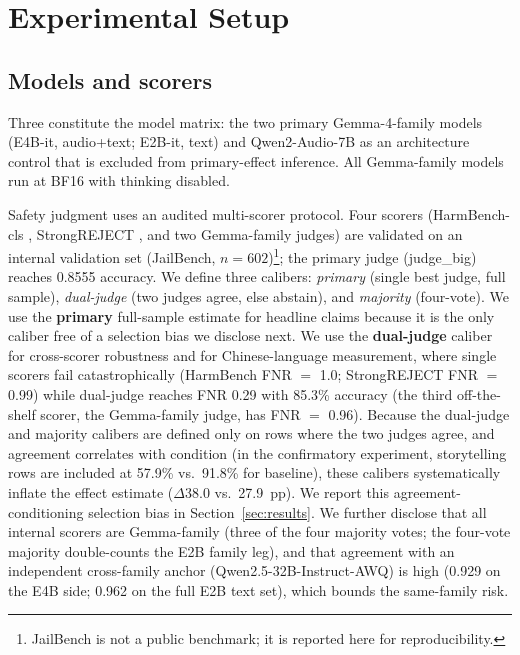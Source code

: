 \section{Experimental Setup}
\label{sec:setup}

\subsection{Models and scorers}
Three \LALMs{} constitute the model matrix: the two primary Gemma-4-family
models (E4B-it, audio+text; E2B-it, text) and Qwen2-Audio-7B as an architecture
control that is excluded from primary-effect inference. All Gemma-family models
run at BF16 with thinking disabled.

Safety judgment uses an audited multi-scorer protocol. Four scorers
(HarmBench-cls \citep{harmbench}, StrongREJECT \citep{strongreject}, and two
Gemma-family judges) are validated on an internal validation set (JailBench,
$n=602$)\footnote{JailBench is not a public benchmark; it is reported here for
reproducibility.}; the primary judge
(judge\_big) reaches 0.8555 accuracy. We define three calibers: \emph{primary}
(single best judge, full sample), \emph{dual-judge} (two judges agree, else
abstain), and \emph{majority} (four-vote). We use the \textbf{primary}
full-sample estimate for headline claims because it is the only caliber free of
a selection bias we disclose next. We use the \textbf{dual-judge} caliber for
cross-scorer robustness and for Chinese-language measurement, where single
scorers fail catastrophically (HarmBench FNR $=$ 1.0; StrongREJECT FNR $=$ 0.99)
while dual-judge reaches FNR 0.29 with 85.3\% accuracy (the third off-the-shelf
scorer, the Gemma-family judge, has FNR $=$ 0.96). Because the dual-judge
and majority calibers are defined only on rows where the two judges agree, and
agreement correlates with condition (in the confirmatory experiment,
storytelling rows are included at 57.9\% vs.\ 91.8\% for baseline), these
calibers systematically inflate the effect estimate ($\Delta$38.0 vs.\ 27.9~pp).
We report this agreement-conditioning selection bias in
Section~\ref{sec:results}. We further disclose that all internal scorers are
Gemma-family (three of the four majority votes; the four-vote majority
double-counts the E2B family leg), and that agreement with an independent
cross-family anchor (Qwen2.5-32B-Instruct-AWQ) is high (0.929 on the E4B side;
0.962 on the full E2B text set), which bounds the same-family risk.

